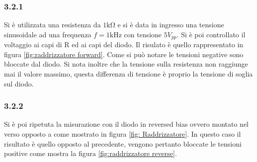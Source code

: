 \subsubsection{3.2.1}
Si è utilizzata una resistenza da $1\unit{\kohm}$ e si è data in ingresso una tensione sinusoidale ad una frequenza $f=1\unit{\kHz}$ con tensione $5V_{pp}$.
Si è poi controllato il voltaggio ai capi di R ed ai capi del diodo.
Il risulato è quello rappresentato in figura \ref{fig:raddrizzatore forward}. Come si può notare le tensioni negative sono bloccate dal diodo. Si nota inoltre che la tensione sulla resistenza non raggiunge mai il valore massimo, questa differenza di tensione è proprio la tensione di soglia sul diodo.
\subsubsection{3.2.2}
Si è poi ripetuta la misurazione con il diodo in reversed bias ovvero montato nel verso opposto a come mostrato in figura \ref{fig: Raddrizzatore}. In questo caso il risultato è quello opposto al precedente, vengono pertanto bloccate le tensioni positive come mostra la figura \ref{fig:raddrizzatore reverse}.
